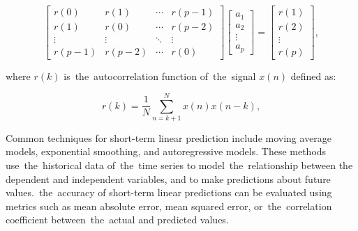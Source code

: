 \begin{equation}
  \begin{bmatrix}
    r(0) & r(1) & \cdots & r(p-1) \\
    r(1) & r(0) & \cdots & r(p-2) \\
    \vdots & \vdots & \ddots & \vdots \\
    r(p-1) & r(p-2) & \cdots & r(0)
  \end{bmatrix}
  \begin{bmatrix}
    a_1 \\
    a_2 \\
    \vdots \\
    a_p
  \end{bmatrix}
  =
  \begin{bmatrix}
    r(1) \\
    r(2) \\
    \vdots \\
    r(p)
  \end{bmatrix},
  \label{eq:matrix-equation}
\end{equation}

where $r(k)$ is~the~autocorrelation function of~the~signal $x(n)$ defined as:

\begin{equation}
  r(k) = \frac{1}{N} \sum_{n=k+1}^{N} x(n) x(n-k),
  \label{eq:autocorrelation}
\end{equation}

Common techniques for short-term linear prediction include moving average models, exponential smoothing, and
autoregressive models. These methods use~the~historical data of~the~time series to model~the~relationship between the
dependent and independent variables, and to make predictions about future values.~the~accuracy of short-term linear
predictions can be evaluated using metrics such as mean absolute error, mean squared error, or~the~correlation
coefficient between~the~actual and predicted values.

